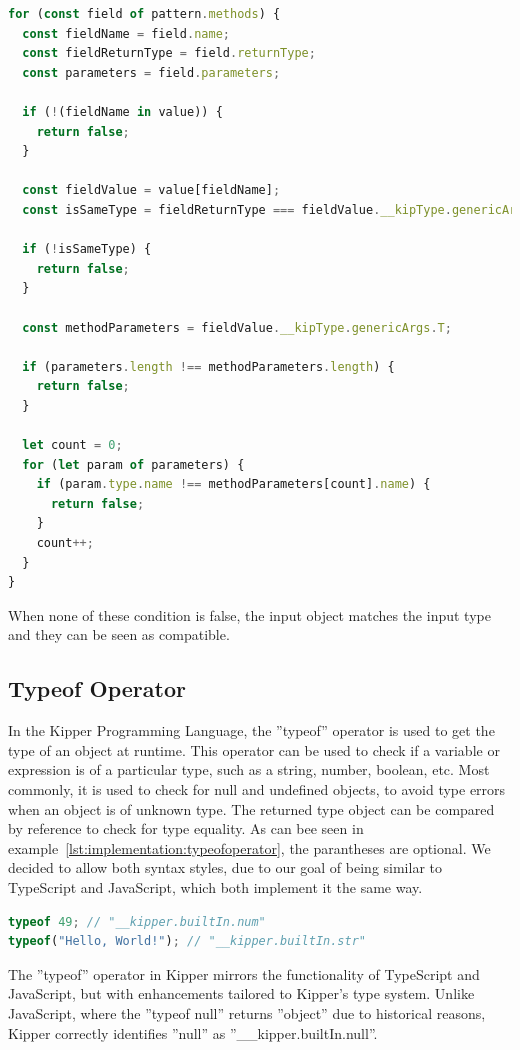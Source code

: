 \begin{lstlisting}[language=Typescript,caption=Matches operator method comparison,label=lst:implementation:matchesmethod]
for (const field of pattern.methods) {
  const fieldName = field.name;
  const fieldReturnType = field.returnType;
  const parameters = field.parameters;

  if (!(fieldName in value)) {
    return false;
  }

  const fieldValue = value[fieldName];
  const isSameType = fieldReturnType === fieldValue.__kipType.genericArgs.R;

  if (!isSameType) {
    return false;
  }

  const methodParameters = fieldValue.__kipType.genericArgs.T;

  if (parameters.length !== methodParameters.length) {
    return false;
  }

  let count = 0;
  for (let param of parameters) {
    if (param.type.name !== methodParameters[count].name) {
      return false;
    }
    count++;
  }
}
\end{lstlisting}

When none of these condition is false, the input object matches the input type and they can be seen as compatible.

\subsection{Typeof Operator}
\label{subsec:typeof}
In the Kipper Programming Language, the ''typeof'' operator is used to get the type of an object at runtime. This operator can be used to check if a variable or expression is of a particular type, such as a string, number, boolean, etc. Most commonly, it is used to check for null and undefined objects, to avoid type errors when an object is of unknown type. The returned type object can be compared by reference to check for type equality. As can bee seen in example~\ref{lst:implementation:typeofoperator}, the parantheses are optional. We decided to allow both syntax styles, due to our goal of being similar to TypeScript and JavaScript, which both implement it the same way.

\begin{lstlisting}[language=Typescript,caption=Typeof operator,label=lst:implementation:typeofoperator]
typeof 49; // "__kipper.builtIn.num"
typeof("Hello, World!"); // "__kipper.builtIn.str"
\end{lstlisting}

The ''typeof'' operator in Kipper mirrors the functionality of TypeScript and JavaScript, but with enhancements tailored to Kipper's type system. Unlike JavaScript, where the ''typeof null'' returns ''object'' due to historical reasons, Kipper correctly identifies ''null'' as ''\_\_kipper.builtIn.null''.

